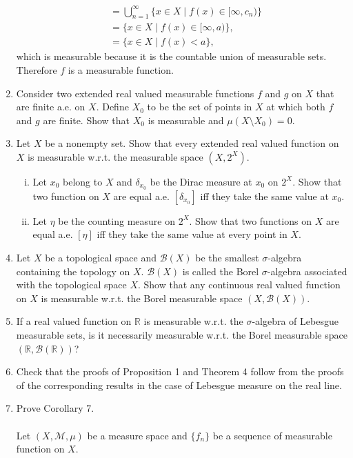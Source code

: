 \begin{enumerate}
\begin{align*}
        &=\bigcup_{n=1}^\infty\{x\in X\mid f(x)\in[\infty,c_n)\}\\
        &=\{x\in X\mid f(x)\in[\infty,a)\},\\
        &=\{x\in X\mid f(x)<a\},
    \end{align*}
    which is measurable because it is the countable union of measurable sets.
    \\Therefore $f$ is a measurable function.
    \item Consider two extended real valued measurable functions $f$ and $g$ on $X$ that are finite a.e. on $X$.
    Define $X_0$ to be the set of points in $X$ at which both $f$ and $g$ are finite.
    Show that $X_0$ is measurable and $\mu(X\setminus X_0)=0$.
    \item Let $X$ be a nonempty set.
    Show that every extended real valued function on $X$ is measurable w.r.t. the measurable space $(X,2^X)$.
    \begin{enumerate}[(i)]
        \item Let $x_0$ belong to $X$ and $\delta_{x_0}$ be the Dirac measure at $x_0$ on $2^X$.
        Show that two function on $X$ are equal a.e. $[\delta_{x_0}]$ iff they take the same value at $x_0$.
        \item Let $\eta$ be the counting measure on $2^X$.
        Show that two functions on $X$ are equal a.e. $[\eta]$ iff they take the same value at every point in $X$.
    \end{enumerate}
    \item Let $X$ be a topological space and $\mathcal{B}(X)$ be the smallest $\sigma$-algebra containing the topology on $X$.
    $\mathcal{B}(X)$ is called the Borel $\sigma$-algebra associated with the topological space $X$.
    Show that any continuous real valued function on $X$ is measurable w.r.t. the Borel measurable space $(X,\mathcal{B}(X))$.
    \item If a real valued function on $\mathbb{R}$ is measurable w.r.t. the $\sigma$-algebra of Lebesgue measurable sets, is it necessarily measurable w.r.t. the Borel measurable space $(\mathbb{R},\mathcal{B}(\mathbb{R}))$?
    \item Check that the proofs of Proposition 1 and Theorem 4 follow from the proofs of the corresponding results in the case of Lebesgue measure on the real line.
    \item Prove Corollary 7.\\
    \\Let $(X,\mathcal{M},\mu)$ be a measure space and $\{f_n\}$ be a sequence of measurable function on $X$.

\end{enumerate}
